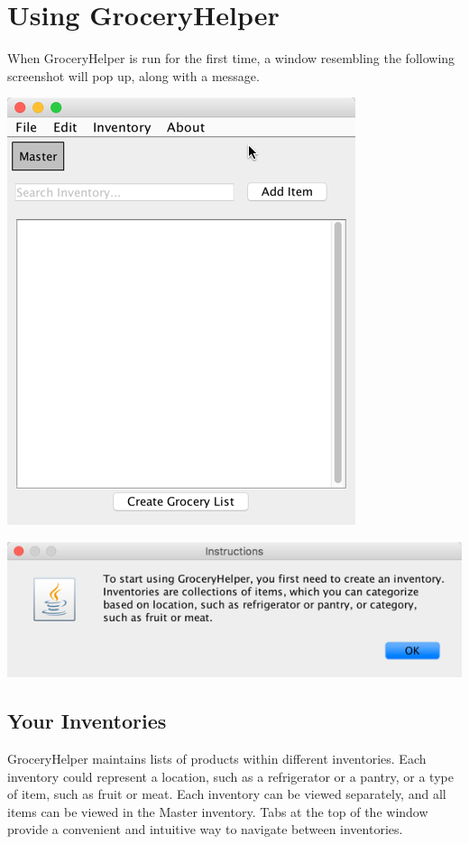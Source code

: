 \documentclass[letterpaper,12pt]{article}
\begin{document}
\section{Using GroceryHelper}

When GroceryHelper is run for the first time, a window resembling the following screenshot will pop up, along with a message.\\

\centerline{\includegraphics[scale=0.5]{08.png}}

\vspace{0.1in}

\centerline{\includegraphics[scale=0.5]{05.png}}


\subsection{Your Inventories}

GroceryHelper maintains lists of products within different inventories. Each inventory could represent a location, such as a refrigerator or a pantry, or a type of item, such as fruit or meat. Each inventory can be viewed separately, and all items can be viewed in the Master inventory. Tabs at the top of the window provide a convenient and intuitive way to navigate between inventories.
\end{document}
